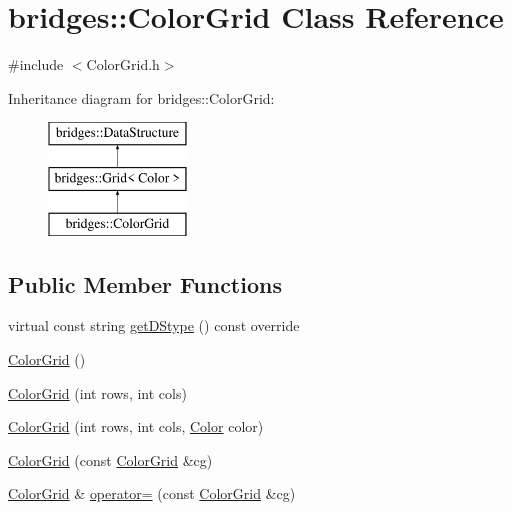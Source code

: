 \hypertarget{classbridges_1_1_color_grid}{}\section{bridges\+:\+:Color\+Grid Class Reference}
\label{classbridges_1_1_color_grid}


{\ttfamily \#include $<$Color\+Grid.\+h$>$}

Inheritance diagram for bridges\+:\+:Color\+Grid\+:\begin{figure}[H]
\begin{center}
\leavevmode
\includegraphics[height=3.000000cm]{classbridges_1_1_color_grid}
\end{center}
\end{figure}
\subsection*{Public Member Functions}
\begin{DoxyCompactItemize}
\item 
virtual const string \mbox{\hyperlink{classbridges_1_1_color_grid_a6bb93994dade8e79a197459532dad153}{get\+D\+Stype}} () const override
\item 
\mbox{\hyperlink{classbridges_1_1_color_grid_a00f6ca6b903228b78538a9f0511ffe46}{Color\+Grid}} ()
\item 
\mbox{\hyperlink{classbridges_1_1_color_grid_ac5fb993701683939d96fd7ac6515efc3}{Color\+Grid}} (int rows, int cols)
\item 
\mbox{\hyperlink{classbridges_1_1_color_grid_a4b731632c040f1fb05636127627603d5}{Color\+Grid}} (int rows, int cols, \mbox{\hyperlink{classbridges_1_1_color}{Color}} color)
\item 
\mbox{\hyperlink{classbridges_1_1_color_grid_a52d98fe72dde164f98e015b11113e592}{Color\+Grid}} (const \mbox{\hyperlink{classbridges_1_1_color_grid}{Color\+Grid}} \&cg)
\item 
\mbox{\hyperlink{classbridges_1_1_color_grid}{Color\+Grid}} \& \mbox{\hyperlink{classbridges_1_1_color_grid_a3d0da9296d6c96207e612bfccd1f3514}{operator=}} (const \mbox{\hyperlink{classbridges_1_1_color_grid}{Color\+Grid}} \&cg)
\end{DoxyCompactItemize}

